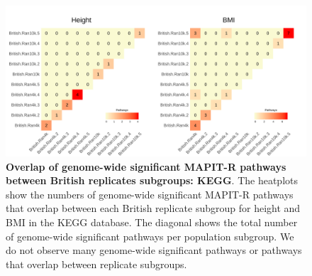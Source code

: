 \documentclass[12pt,a4paper]{article}
\begin{document}
\setcounter{CharNumber4}{1}
\renewcommand{\thefigure}{\arabic{figure}\alph{CharNumber4}}
\begin{landscape}
\begin{figure}[htbp]
\centering
\includegraphics[scale=.2]{Images/Supp/InterPath_Supp_Figure_BritReps_Heatplots_KEGG_vs3.png}
\caption[TBD]{\textbf{Overlap of genome-wide significant MAPIT-R pathways between British replicates subgroups: KEGG}. The heatplots show the numbers of genome-wide significant MAPIT-R pathways that overlap between each British replicate subgroup for height and BMI in the KEGG database. The diagonal shows the total number of genome-wide significant pathways per population subgroup. We do not observe many genome-wide significant pathways or pathways that overlap between replicate subgroups.}
\label{InterPath-Supp-Figure-BritReps-Heatplots-AllPaths-KEGG}
\end{figure}
\clearpage
\addtocounter{figure}{-1}
\addtocounter{CharNumber4}{1}
\end{landscape}
\end{document}
